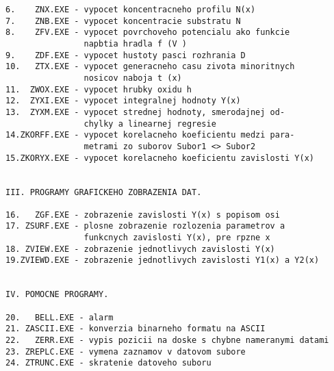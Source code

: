 \begin{verbatim}
6.    ZNX.EXE - vypocet koncentracneho profilu N(x)
7.    ZNB.EXE - vypocet koncentracie substratu N
8.    ZFV.EXE - vypocet povrchoveho potencialu ako funkcie 
                napbtia hradla f (V )
9.    ZDF.EXE - vypocet hustoty pasci rozhrania D
10.   ZTX.EXE - vypocet generacneho casu zivota minoritnych 
                nosicov naboja t (x)
11.  ZWOX.EXE - vypocet hrubky oxidu h
12.  ZYXI.EXE - vypocet integralnej hodnoty Y(x)
13.  ZYXM.EXE - vypocet strednej hodnoty, smerodajnej od-
                chylky a linearnej regresie
14.ZKORFF.EXE - vypocet korelacneho koeficientu medzi para-
                metrami zo suborov Subor1 <> Subor2
15.ZKORYX.EXE - vypocet korelacneho koeficientu zavislosti Y(x)


III. PROGRAMY GRAFICKEHO ZOBRAZENIA DAT.

16.   ZGF.EXE - zobrazenie zavislosti Y(x) s popisom osi
17. ZSURF.EXE - plosne zobrazenie rozlozenia parametrov a
                funkcnych zavislosti Y(x), pre rpzne x
18. ZVIEW.EXE - zobrazenie jednotlivych zavislosti Y(x)
19.ZVIEWD.EXE - zobrazenie jednotlivych zavislosti Y1(x) a Y2(x)


IV. POMOCNE PROGRAMY.

20.   BELL.EXE - alarm
21. ZASCII.EXE - konverzia binarneho formatu na ASCII
22.   ZERR.EXE - vypis pozicii na doske s chybne nameranymi datami
23. ZREPLC.EXE - vymena zaznamov v datovom subore
24. ZTRUNC.EXE - skratenie datoveho suboru
\end{verbatim}
